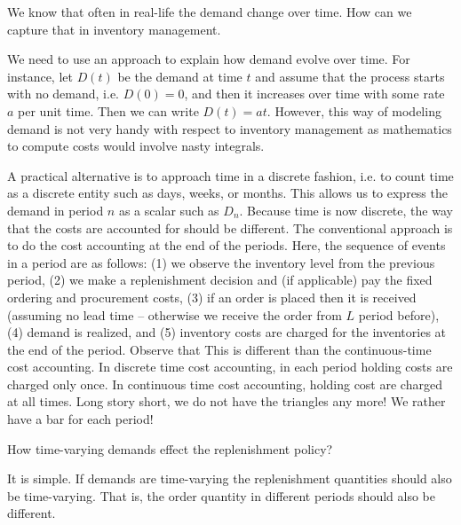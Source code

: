 \begin{question}
We know that often in real-life the demand change over time. How can we capture that in inventory management.
\end{question}

\begin{solution}
We need to use an approach to explain how demand evolve over time. For instance, let $D(t)$ be the demand at time $t$ and assume that the process starts with no demand, i.e. $D(0)=0$, and then it increases over time with some rate $a$ per unit time. Then we can write $D(t)=at$. However, this way of modeling demand is not very handy with respect to inventory management as mathematics to compute costs would involve nasty integrals. 

A practical alternative is to approach time in a discrete fashion, i.e. to count time as a discrete entity such as days, weeks, or months. This allows us to express the demand in period $n$ as a scalar such as $D_n$. Because time is now discrete, the way that the costs are accounted for should be different. The conventional approach is to do the cost accounting at the end of the periods. Here, the sequence of events in a period are as follows: (1) we observe the inventory level from the previous period, (2) we make a replenishment decision and (if applicable) pay the fixed ordering and procurement costs, (3) if an order is placed then it is received (assuming no lead time -- otherwise we receive the order from $L$ period before), (4) demand is realized, and (5) inventory costs are charged for the inventories at the end of the period. Observe that This is different than the continuous-time cost accounting. In discrete time cost accounting, in each period holding costs are charged only once. In continuous time cost accounting, holding cost are charged at all times. Long story short, we do not have the triangles any more! We rather have a bar for each period! 
\end{solution}

\begin{question}
How time-varying demands effect the replenishment policy?
\end{question}

\begin{solution}
It is simple. If demands are time-varying the replenishment quantities should also be time-varying. That is, the order quantity in different periods should also be different. 
\end{solution}


